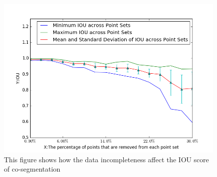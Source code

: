 \begin{figure}
	\centering
	\includegraphics[width=\linewidth]{images/incompleteness/IOU.png}
	\caption{This figure shows how the data incompleteness affect the IOU score of co-segmentation}
	\label{fig:incompleteness}
\end{figure}
